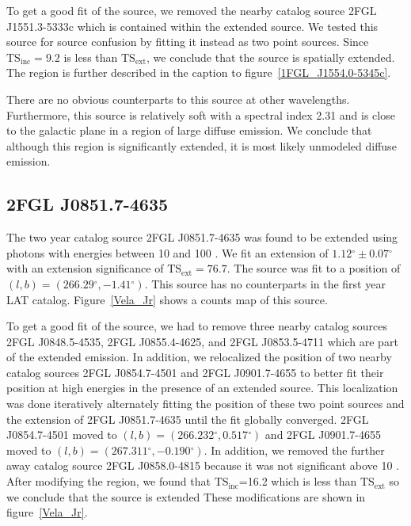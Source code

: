 \documentclass[12pt,preprint]{aastex}
\newcommand{\gev}{\text{GeV}\xspace}
\newcommand{\tsext}{{\ensuremath{\text{TS}_\text{ext}}}\xspace}
\newcommand{\tsinc}{\ensuremath{\text{TS}_\text{inc}}\xspace}
\renewcommand{\deg}{\ensuremath{^\circ}\xspace}
\begin{document}
To get a good fit of the source, we removed the nearby catalog source
2FGL J1551.3-5333c which is contained within the extended source.
We tested this source for source confusion by fitting it instead as
two point sources.  Since $\tsinc=9.2$ is less than \tsext, we conclude
that the source is spatially extended. The region is further described
in the caption to figure~\ref{1FGL_J1554.0-5345c}.

There are no obvious counterparts to this source at other
wavelengths. Furthermore, this source is relatively soft with a spectral
index 2.31 and is close to the galactic plane in a region of large
diffuse emission.  We conclude that although this region is significantly
extended, it is most likely unmodeled diffuse emission.


\subsection{2FGL J0851.7-4635}
\label{section_2FGL_J0851.7-4635}


The two year catalog source 2FGL J0851.7-4635 was found to be
extended using photons with energies between 10 \gev and 100
\gev. We fit an extension of $1.12\deg\pm0.07\deg$ with an extension
significance of $\tsext=76.7$.  The source was fit to a position of
$(l,b)=(266.29\deg,-1.41\deg)$.  
This source has no counterparts in the first year LAT catalog.
Figure~\ref{Vela_Jr} shows a counts map of this source.  

To get a good fit of the source, we had to remove three nearby catalog
sources 2FGL J0848.5-4535, 2FGL J0855.4-4625, and 2FGL J0853.5-4711
which are part of the extended emission.  In addition, we relocalized
the position of two nearby catalog sources 2FGL J0854.7-4501 and 2FGL
J0901.7-4655 to better fit their position at high energies in the presence
of an extended source.  This localization was done iteratively alternately 
fitting the position of these two point sources and the extension of
2FGL J0851.7-4635 until the fit globally converged.  2FGL J0854.7-4501
moved to $(l,b)=(266.232\deg,0.517\deg)$ and 2FGL J0901.7-4655 moved to
$(l,b)=(267.311\deg,-0.190\deg)$. In addition, we removed the further away
catalog source 2FGL J0858.0-4815 because it was not significant above 10
\gev.  After modifying the region, we found that \tsinc=16.2 which is less
than \tsext so we conclude that the source is extended 
These modifications are shown in
figure~\ref{Vela_Jr}.
\end{document}
